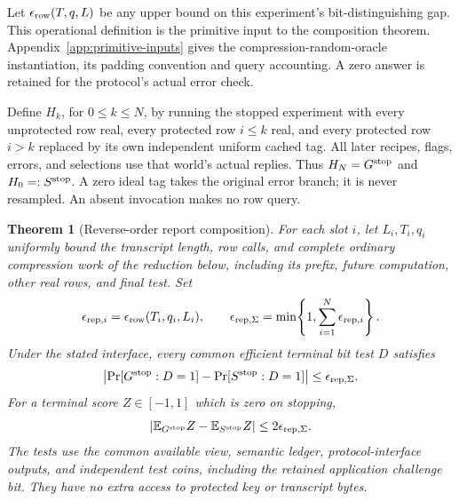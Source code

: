 \documentclass[pdflatex]{sn-jnl}
\theoremstyle{thmstyleone}
\newtheorem{theorem}{Theorem}[section]
\theoremstyle{thmstylethree}
\theoremstyle{thmstyletwo}
\begin{document}
Let $\epsilon_{\rm row}(T,q,L)$ be any upper bound on this experiment's
bit-distinguishing gap. This operational definition is the primitive input to
the composition theorem. Appendix~\ref{app:primitive-inputs} gives the
compression-random-oracle instantiation, its padding convention and query
accounting. A zero answer is retained for the protocol's actual error check.

Define $H_k$, for $0\le k\le N$, by running the stopped experiment with every
unprotected row real, every protected row $i\le k$ real, and every protected
row $i>k$ replaced by its own independent uniform cached tag.  All later
recipes, flags, errors, and selections use that world's actual replies.
Thus $H_N=G^{\rm stop}$ and $H_0=:S^{\rm stop}$.  A zero ideal tag takes the
original error branch; it is never resampled.  An absent invocation makes no
row query.

\begin{theorem}[Reverse-order report composition]
\label{thm:report-reverse-composition}
For each slot $i$, let $L_i,T_i,q_i$ uniformly bound the transcript length,
row calls, and complete ordinary compression work of the reduction below,
including its prefix, future computation, other real rows, and final test.
Set
\[
 \epsilon_{{\rm rep},i}
   =\epsilon_{\rm row}(T_i,q_i,L_i),
 \qquad
 \epsilon_{{\rm rep},\Sigma}
   =\min\!\left\{1,\sum_{i=1}^N\epsilon_{{\rm rep},i}\right\}.
\]
Under the stated interface, every common efficient terminal bit test $D$
satisfies
\[
 \left|\Pr[G^{\rm stop}:D=1]
       -\Pr[S^{\rm stop}:D=1]\right|
 \le\epsilon_{{\rm rep},\Sigma}.
\]
For a terminal score $Z\in[-1,1]$ which is zero on stopping,
\[
 \left|\mathbb E_{G^{\rm stop}}Z
       -\mathbb E_{S^{\rm stop}}Z\right|
 \le2\epsilon_{{\rm rep},\Sigma}.
\]
The tests use the common available view, semantic ledger, protocol-interface
outputs, and independent test coins, including the retained application
challenge bit.  They have no extra access to protected key or transcript bytes.
\end{theorem}
\end{document}
